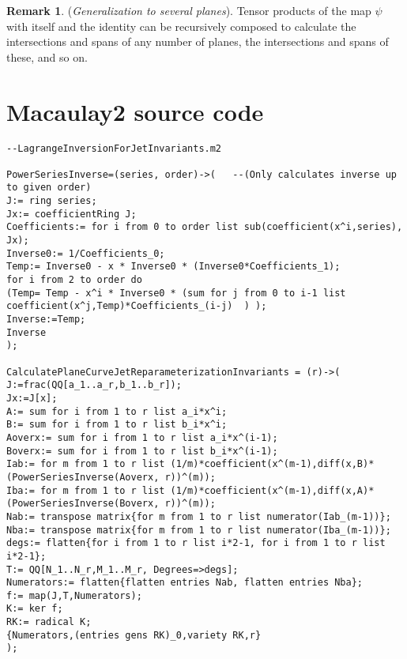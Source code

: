 \documentclass[12pt]{article}
\numberwithin{equation}{section}
\theoremstyle{plain}
\theoremstyle{definition}
\newtheorem{remark}[definition]{Remark}
\begin{document}
\begin{remark}(\emph{Generalization to several planes}). Tensor products of the map $\psi$ with itself and the identity can be recursively composed to calculate the intersections and spans of any number of planes, the intersections and spans of these, and so on.
\end{remark}

\section{Macaulay2 source code}\label{macapp}
\thispagestyle{empty}
\begin{lstlisting}
--LagrangeInversionForJetInvariants.m2

PowerSeriesInverse=(series, order)->(   --(Only calculates inverse up to given order)
J:= ring series;
Jx:= coefficientRing J;
Coefficients:= for i from 0 to order list sub(coefficient(x^i,series), Jx);
Inverse0:= 1/Coefficients_0;
Temp:= Inverse0 - x * Inverse0 * (Inverse0*Coefficients_1);
for i from 2 to order do
(Temp= Temp - x^i * Inverse0 * (sum for j from 0 to i-1 list coefficient(x^j,Temp)*Coefficients_(i-j)  ) );
Inverse:=Temp;
Inverse
);

CalculatePlaneCurveJetReparameterizationInvariants = (r)->(
J:=frac(QQ[a_1..a_r,b_1..b_r]);
Jx:=J[x];
A:= sum for i from 1 to r list a_i*x^i;
B:= sum for i from 1 to r list b_i*x^i;
Aoverx:= sum for i from 1 to r list a_i*x^(i-1);
Boverx:= sum for i from 1 to r list b_i*x^(i-1);
Iab:= for m from 1 to r list (1/m)*coefficient(x^(m-1),diff(x,B)*(PowerSeriesInverse(Aoverx, r))^(m));
Iba:= for m from 1 to r list (1/m)*coefficient(x^(m-1),diff(x,A)*(PowerSeriesInverse(Boverx, r))^(m));
Nab:= transpose matrix{for m from 1 to r list numerator(Iab_(m-1))};
Nba:= transpose matrix{for m from 1 to r list numerator(Iba_(m-1))};
degs:= flatten{for i from 1 to r list i*2-1, for i from 1 to r list i*2-1};
T:= QQ[N_1..N_r,M_1..M_r, Degrees=>degs];
Numerators:= flatten{flatten entries Nab, flatten entries Nba};
f:= map(J,T,Numerators);
K:= ker f;
RK:= radical K;
{Numerators,(entries gens RK)_0,variety RK,r}
);


\end{lstlisting}
\end{document}
